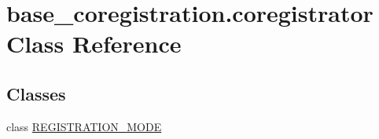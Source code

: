 \hypertarget{classbase__coregistration_1_1coregistrator}{\section{base\-\_\-coregistration.\-coregistrator Class Reference}
\label{classbase__coregistration_1_1coregistrator}
}
\subsection*{Classes}
\begin{DoxyCompactItemize}
\item 
class \hyperlink{classbase__coregistration_1_1coregistrator_1_1REGISTRATION__MODE}{R\-E\-G\-I\-S\-T\-R\-A\-T\-I\-O\-N\-\_\-\-M\-O\-D\-E}
\end{DoxyCompactItemize}
